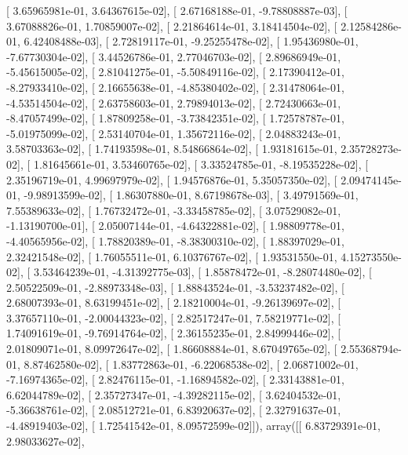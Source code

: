 \documentclass{article}
\begin{document}
       [  3.65965981e-01,   3.64367615e-02],
       [  2.67168188e-01,  -9.78808887e-03],
       [  3.67088826e-01,   1.70859007e-02],
       [  2.21864614e-01,   3.18414504e-02],
       [  2.12584286e-01,   6.42408488e-03],
       [  2.72819117e-01,  -9.25255478e-02],
       [  1.95436980e-01,  -7.67730304e-02],
       [  3.44526786e-01,   2.77046703e-02],
       [  2.89686949e-01,  -5.45615005e-02],
       [  2.81041275e-01,  -5.50849116e-02],
       [  2.17390412e-01,  -8.27933410e-02],
       [  2.16655638e-01,  -4.85380402e-02],
       [  2.31478064e-01,  -4.53514504e-02],
       [  2.63758603e-01,   2.79894013e-02],
       [  2.72430663e-01,  -8.47057499e-02],
       [  1.87809258e-01,  -3.73842351e-02],
       [  1.72578787e-01,  -5.01975099e-02],
       [  2.53140704e-01,   1.35672116e-02],
       [  2.04883243e-01,   3.58703363e-02],
       [  1.74193598e-01,   8.54866864e-02],
       [  1.93181615e-01,   2.35728273e-02],
       [  1.81645661e-01,   3.53460765e-02],
       [  3.33524785e-01,  -8.19535228e-02],
       [  2.35196719e-01,   4.99697979e-02],
       [  1.94576876e-01,   5.35057350e-02],
       [  2.09474145e-01,  -9.98913599e-02],
       [  1.86307880e-01,   8.67198678e-03],
       [  3.49791569e-01,   7.55389633e-02],
       [  1.76732472e-01,  -3.33458785e-02],
       [  3.07529082e-01,  -1.13190700e-01],
       [  2.05007144e-01,  -4.64322881e-02],
       [  1.98809778e-01,  -4.40565956e-02],
       [  1.78820389e-01,  -8.38300310e-02],
       [  1.88397029e-01,   2.32421548e-02],
       [  1.76055511e-01,   6.10376767e-02],
       [  1.93531550e-01,   4.15273550e-02],
       [  3.53464239e-01,  -4.31392775e-03],
       [  1.85878472e-01,  -8.28074480e-02],
       [  2.50522509e-01,  -2.88973348e-03],
       [  1.88843524e-01,  -3.53237482e-02],
       [  2.68007393e-01,   8.63199451e-02],
       [  2.18210004e-01,  -9.26139697e-02],
       [  3.37657110e-01,  -2.00044323e-02],
       [  2.82517247e-01,   7.58219771e-02],
       [  1.74091619e-01,  -9.76914764e-02],
       [  2.36155235e-01,   2.84999446e-02],
       [  2.01809071e-01,   8.09972647e-02],
       [  1.86608884e-01,   8.67049765e-02],
       [  2.55368794e-01,   8.87462580e-02],
       [  1.83772863e-01,  -6.22068538e-02],
       [  2.06871002e-01,  -7.16974365e-02],
       [  2.82476115e-01,  -1.16894582e-02],
       [  2.33143881e-01,   6.62044789e-02],
       [  2.35727347e-01,  -4.39282115e-02],
       [  3.62404532e-01,  -5.36638761e-02],
       [  2.08512721e-01,   6.83920637e-02],
       [  2.32791637e-01,  -4.48919403e-02],
       [  1.72541542e-01,   8.09572599e-02]]), array([[  6.83729391e-01,   2.98033627e-02],
\end{document}
